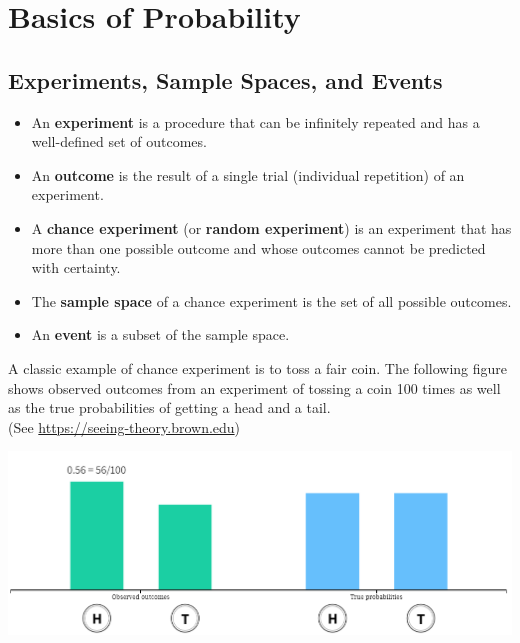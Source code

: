 
\section{Basics of Probability}

\hypertarget{experiments-sample-spaces-and-events}{%
\subsection{Experiments, Sample Spaces, and
Events}\label{experiments-sample-spaces-and-events}}

\begin{itemize}
\item
  An \textbf{experiment} is a procedure that can be infinitely repeated
  and has a well-defined set of outcomes.
\item
  An \textbf{outcome} is the result of a single trial (individual
  repetition) of an experiment.
\item
  A \textbf{chance experiment} (or \textbf{random experiment}) is an
  experiment that has more than one possible outcome and whose outcomes
  cannot be predicted with certainty.
\item
  The \textbf{sample space} of a chance experiment is the set of all
  possible outcomes.
\item
  An \textbf{event} is a subset of the sample space.
\end{itemize}

\begin{example}
A classic example of chance experiment is to toss a fair coin. The following figure shows observed outcomes from an experiment of tossing a coin 100 times as well as the true probabilities of getting a head and a tail.\\ (See \url{https://seeing-theory.brown.edu})

\includegraphics[width=\textwidth]{Figures/ChanceEvent.png}


\end{example}

